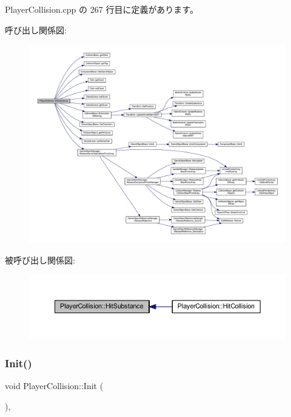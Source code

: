 Player\+Collision.\+cpp の 267 行目に定義があります。

呼び出し関係図\+:
\nopagebreak
\begin{figure}[H]
\begin{center}
\leavevmode
\includegraphics[width=350pt]{class_player_collision_a5048cc608d72d03d02b23c5533dbfd10_cgraph}
\end{center}
\end{figure}
被呼び出し関係図\+:\nopagebreak
\begin{figure}[H]
\begin{center}
\leavevmode
\includegraphics[width=350pt]{class_player_collision_a5048cc608d72d03d02b23c5533dbfd10_icgraph}
\end{center}
\end{figure}
\mbox{\label{class_player_collision_a3dd6238b75933fd60aee77e92353cc44}} 
\subsubsection{\texorpdfstring{Init()}{Init()}}
{\footnotesize\ttfamily void Player\+Collision\+::\+Init (\begin{DoxyParamCaption}{ }\end{DoxyParamCaption})\hspace{0.3cm}{\ttfamily [override]}, {\ttfamily [virtual]}}



